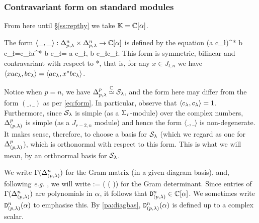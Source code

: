 \subsubsection{Contravariant form on standard modules}

From here until \S\ref{ss:repthy} we take $\mathbb{K} = \mathbb{C}[\alpha]$.   %

\mdef   \label{de:grammat}
The  form 
$ \langle\_,\_\rangle : \Delta^{n}_{p,\lambda} \times \Delta^{n}_{p,\lambda} \rightarrow \mathbb{C}[\alpha]$ 
is defined by the equation
\beq 
(a c_\l)^* b c_\l=c_\l a^* b c_\l   \;= \;\; \langle a c_\l, b c_\l \rangle c_{\l}.  \label{eq:Gform}
\eq
This form is symmetric, bilinear and contravariant with respect to *, that is, for any $x\in J_{l,n}$ we have $\langle x a c_\lambda,  b c_\lambda \rangle=\langle a c_\lambda, x^* b c_\lambda \rangle$. 

\mdef 
Notice when $p=n$, we have 
$\Delta^{p}_{p,\lambda} \stackrel{\mathbb{C}}{\simeq} \mathcal{S}_{\lambda}$, 
and the form here may differ from  the form $(\_,\_)$ as per \eqref{eq:form}. 
In particular, observe that $\langle c_\lambda, c_\lambda \rangle=1$. %
Furthermore,  since $\mathcal{S}_\lambda$ is simple (as a $\Sigma_r$-module) over the complex numbers, $\Delta^p_{(p,\lambda)}$ is simple (as a $J_{r-2,n}$ module) and hence the form $\langle\_,\_\rangle$ is non-degenerate. It makes sense, therefore, to choose a basis for $\mathcal{S}_\lambda$ (which we regard as one for $\Delta^p_{(p,\lambda)}$), which is orthonormal with respect to this form. This is what we will mean, by an orthnormal basis for $\mathcal{S}_\lambda$.


\mdef   \label{de:gramdet}
We write $\Gamma(\Delta^{n}_{(p,\lambda)})$ 
for the Gram matrix (in a given diagram basis), and,  following \textit{e.g.} \cite{ShBr},
we will write 
\beq
{}  \; := \; \det( \Gamma( ))   %
\eq 
for the Gram determinant. Since entries of $\Gamma(\Delta^{n}_{(p,\lambda)})$ are polynomials in $\alpha$, it follows that $
{\mathtt D}^{n}_{(p,\lambda)}\in \mathbb{C}[\alpha]$. We sometimes write $
{\mathtt D}^{n}_{(p,\lambda)}(\alpha)$ to emphasise this. By \ref{pa:diagbas}, ${\mathtt D}^{n}_{(p,\lambda)}(\alpha)$ is defined up to a complex scalar.   


